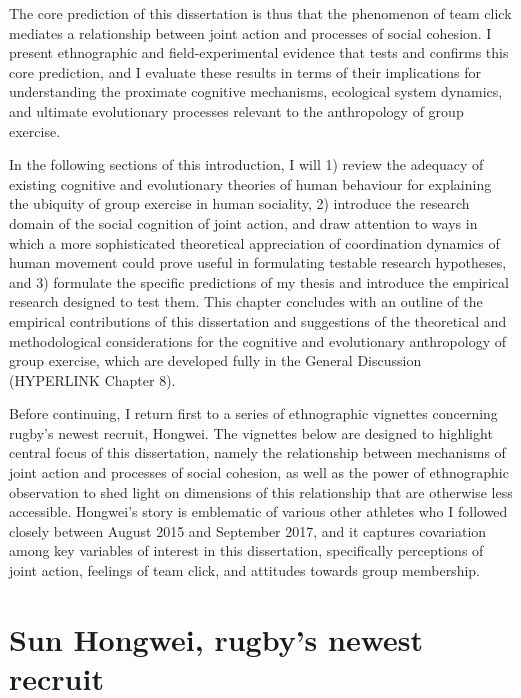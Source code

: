 The core prediction of this dissertation is thus that the phenomenon of team click mediates a relationship between joint action and processes of social cohesion. I present ethnographic and field-experimental evidence that tests and confirms this core prediction, and I evaluate these results in terms of their implications for understanding the proximate cognitive mechanisms, ecological system dynamics, and ultimate evolutionary processes relevant to the anthropology of group exercise.

In the following sections of this introduction, I will 1) review the adequacy of existing cognitive and evolutionary theories of human behaviour for explaining the ubiquity of group exercise in human sociality, 2) introduce the research domain of the social cognition of joint action, and draw attention to ways in which a more sophisticated theoretical appreciation of coordination dynamics of human movement could prove useful in formulating testable research hypotheses, and 3) formulate the specific predictions of my thesis and introduce the empirical research designed to test them.  This chapter concludes with an outline of the empirical contributions of this dissertation and suggestions of the theoretical and methodological considerations for the cognitive and evolutionary anthropology of group exercise, which are developed fully in the General Discussion (HYPERLINK Chapter 8).

Before continuing, I return first to a series of ethnographic vignettes concerning rugby's newest recruit, Hongwei. The vignettes below are designed to highlight central focus of this dissertation, namely the relationship between mechanisms of joint action and processes of social cohesion, as well as the power of ethnographic observation to shed light on dimensions of this relationship that are otherwise less accessible.  Hongwei's story is emblematic of various other athletes who I followed closely between August 2015 and September 2017, and it captures covariation among key variables of interest in this dissertation, specifically perceptions of joint action, feelings of team click, and attitudes towards group membership.

\section{Sun Hongwei, rugby's newest recruit}

